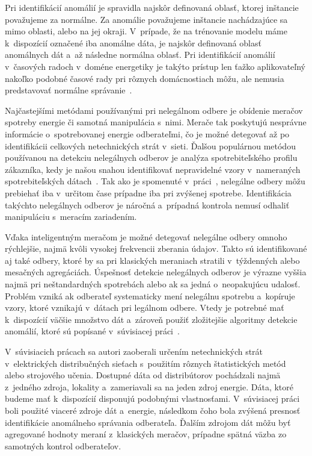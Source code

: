 \documentclass[a4paper,twoside,slovak,12pt,appendix]{article}
\begin{document}
Pri identifikácií anomálií je spravidla najskôr definovaná oblasť, ktorej
inštancie považujeme za normálne. Za anomálie považujeme inštancie nachádzajúce
sa mimo oblasti, alebo na jej okraji. V~prípade, že na trénovanie modelu máme
k~dispozícií označené iba anomálne dáta, je najskôr definovaná oblasť anomálnych
dát a~až následne normálna oblasť. Pri identifikácií anomálií v~časových radoch
v~doméne energetiky je takýto prístup len ťažko aplikovateľný nakoľko podobné
časové rady pri rôznych domácnostiach môžu, ale nemusia predstavovať normálne
správanie~\cite{Spiric2015}.

Najčastejšími metódami používanými pri nelegálnom odbere je obídenie meračov
spotreby energie či samotná manipulácia s~nimi. Merače tak poskytujú nesprávne
informácie o~spotrebovanej energie odberateľmi, čo je možné detegovať až po
identifikácii celkových netechnických strát v~sieti. Ďalšou populárnou metódou
používanou na detekciu nelegálnych odberov je analýza spotrebiteľského
profilu zákazníka, kedy je našou snahou identifikovať nepravidelné vzory
v~nameraných spotrebiteľských dátach~\cite{Sahoo2015}. Tak ako je spomenuté
v~práci~\cite{Depuru2012}, nelegálne odbery môžu prebiehať iba v~určitom čase
prípadne iba pri zvýšenej spotrebe. Identifikácia takýchto nelegálnych odberov
je náročná a~prípadná kontrola nemusí odhaliť manipuláciu s~meracím zariadením.

Vďaka inteligentným meračom je možné detegovať nelegálne odbery omnoho
rýchlejšie, najmä kvôli vysokej frekvencii zberania údajov. Takto sú
identifikované aj také odbery, ktoré by sa pri klasických meraniach stratili
v~týždenných alebo mesačných agregáciách. Úspešnosť detekcie nelegálnych odberov
je výrazne vyššia najmä pri neštandardných spotrebách alebo ak sa jedná
o~neopakujúcu udalosť. Problém vzniká ak odberateľ systematicky mení
nelegálnu spotrebu a~kopíruje vzory, ktoré vznikajú v~dátach pri legálnom
odbere. Vtedy je potrebné mať k~dispozícií väčšie množstvo dát a~zároveň použiť
zložitejšie algoritmy detekcie anomálií, ktoré sú popísané v~súvisiacej
práci~\cite{Nikovski2013}.

V~súvisiacich prácach sa autori zaoberali určením netechnických strát
v~elektrických distribučných sieťach s~použitím rôznych štatistických metód
alebo strojového učenia. Dostupné dáta od distribútorov pochádzali najmä
z~jedného zdroja, lokality a~zameriavali sa na jeden zdroj energie. Dáta, ktoré
budeme mať k~dispozícií disponujú podobnými vlastnosťami. V~súvisiacej
práci~\cite{Coma-Puig2016} boli použité viaceré zdroje dát a~energie, následkom
čoho bola zvýšená presnosť identifikácie anomálneho správania odberateľa.
Ďalším zdrojom dát môžu byť agregované hodnoty meraní z~klasických meračov,
prípadne spätná väzba zo samotných kontrol odberateľov.
\end{document}
